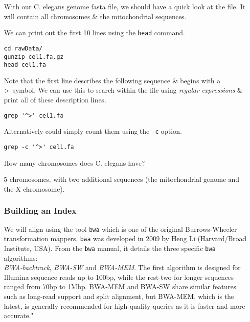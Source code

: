 \begin{information}
With our C. elegans genome fasta file, we should have a quick look at the file.
It will contain all chromosomes \& the mitochondrial sequences.
\end{information}

\begin{steps}
We can print out the first 10 lines using the \texttt{head} command.
\begin{lstlisting}
cd rawData/
gunzip cel1.fa.gz
head cel1.fa
\end{lstlisting}
Note that the first line describes the following sequence \& begins with a \textgreater ~symbol.
We can use this to search within the file using \textit{regular expressions} \& print all of these description lines.
\begin{lstlisting}
grep '^>' cel1.fa
\end{lstlisting}
Alternatively could simply count them using the \texttt{-c} option.
\begin{lstlisting}
grep -c '^>' cel1.fa
\end{lstlisting}
\end{steps}

\begin{questions}
How many chromosomes does C. elegans have?\\
\begin{answer}
5 chromosomes, with two additional sequences (the mitochondrial genome and the X chromosome).
\end{answer}
\end{questions}

\subsubsection{Building an Index}
We will align using the tool \texttt{bwa} which is one of the original Burrows-Wheeler transformation mappers.
\texttt{bwa} was developed in 2009 by Heng Li (Harvard/Broad Institute, USA).
From the \texttt{bwa} manual, it details the three specific \texttt{bwa} algorithms: \\
\textit{BWA-backtrack}, \textit{BWA-SW} and \textit{BWA-MEM}. The first algorithm is designed for Illumina  sequence  reads up to 100bp, while the rest two for longer sequences ranged from 70bp to 1Mbp. BWA-MEM and BWA-SW share similar features such as long-read support and split alignment, but BWA-MEM, which is the latest, is generally recommended for high-quality queries as it  is  faster  and  more accurate."  \\


